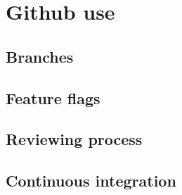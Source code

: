 \section{Github use}
\label{sec:github}

\subsection{Branches}
\label{ssec:branches}

\subsection{Feature flags}
\label{ssec:flags}

\subsection{Reviewing process}
\label{ssec:reviewing}

\subsection{Continuous integration}
\label{ssec:ci}
